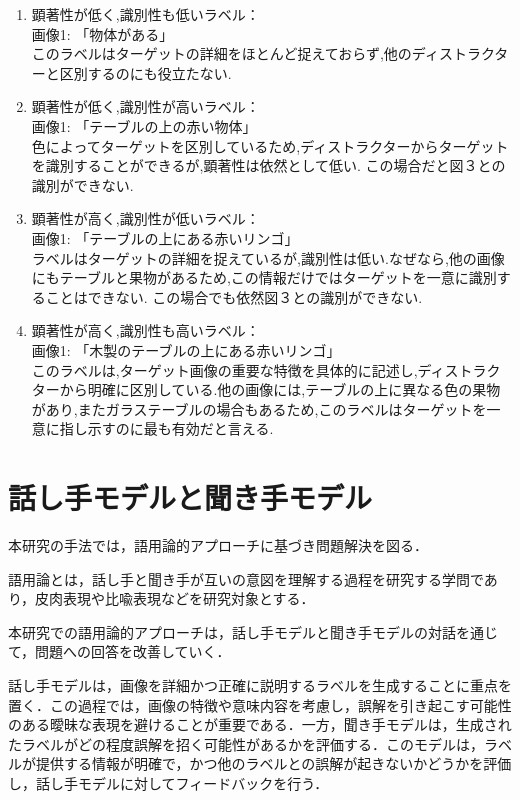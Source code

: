 \documentclass[a4paper,11pt]{jreport}
\begin{document}
\begin{enumerate}
  \item 顕著性が低く,識別性も低いラベル：\\
  画像1: 「物体がある」\\
  このラベルはターゲットの詳細をほとんど捉えておらず,他のディストラクターと区別するのにも役立たない.
  \item 顕著性が低く,識別性が高いラベル：\\
  画像1: 「テーブルの上の赤い物体」\\
  色によってターゲットを区別しているため,ディストラクターからターゲットを識別することができるが,顕著性は依然として低い.
  この場合だと図３との識別ができない.
  \item 顕著性が高く,識別性が低いラベル：\\
  画像1: 「テーブルの上にある赤いリンゴ」\\
  ラベルはターゲットの詳細を捉えているが,識別性は低い.なぜなら,他の画像にもテーブルと果物があるため,この情報だけではターゲットを一意に識別することはできない.
  この場合でも依然図３との識別ができない.
  \item 顕著性が高く,識別性も高いラベル：\\
  画像1: 「木製のテーブルの上にある赤いリンゴ」\\
  このラベルは,ターゲット画像の重要な特徴を具体的に記述し,ディストラクターから明確に区別している.他の画像には,テーブルの上に異なる色の果物があり,またガラステーブルの場合もあるため,このラベルはターゲットを一意に指し示すのに最も有効だと言える.
\end{enumerate}


\section{話し手モデルと聞き手モデル}

本研究の手法では，語用論的アプローチに基づき問題解決を図る．

語用論とは，話し手と聞き手が互いの意図を理解する過程を研究する学問であり，皮肉表現や比喩表現などを研究対象とする．

本研究での語用論的アプローチは，話し手モデルと聞き手モデルの対話を通じて，問題への回答を改善していく．

話し手モデルは，画像を詳細かつ正確に説明するラベルを生成することに重点を置く．この過程では，画像の特徴や意味内容を考慮し，誤解を引き起こす可能性のある曖昧な表現を避けることが重要である．一方，聞き手モデルは，生成されたラベルがどの程度誤解を招く可能性があるかを評価する．このモデルは，ラベルが提供する情報が明確で，かつ他のラベルとの誤解が起きないかどうかを評価し，話し手モデルに対してフィードバックを行う．
\end{document}
